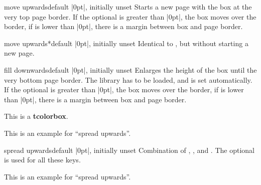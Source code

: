 \begin{docTcbKey}[][doc new=2017-02-13]{move upwards}{}{default |0pt|, initially unset}
Starts a new page with the box at the very top page border.
If the optional  is greater than |0pt|, the box
moves over the border, if  is lower than |0pt|, there is a
margin between box and page border.
\end{docTcbKey}


\begin{docTcbKey}[][doc new=2017-02-13]{move upwards*}{}{default |0pt|, initially unset}
Identical to , but without starting a new page.
\end{docTcbKey}


\begin{docTcbKey}[][doc new=2017-02-13]{fill downwards}{}{default |0pt|, initially unset}
Enlarges the height of the box until the very bottom page border.
The library  has to be loaded, and
 is set automatically.
If the optional  is greater than |0pt|, the box
moves over the border, if  is lower than |0pt|, there is a
margin between box and page border.
\begin{dispListing}
\begin{tcolorbox}[enhanced,fill downwards,
  colframe=blue!75!black,colback=white,show bounding box]
This is a \textbf{tcolorbox}.
\end{tcolorbox}
\end{dispListing}
{\tcbusetemp}
\end{docTcbKey}


\begin{tcolorbox}[enhanced,spread upwards,sharp corners=north,height=3cm,
  colframe=blue!75!black,interior style={top color=blue!50,bottom color=white}]
This is an example for ``spread upwards''.
\end{tcolorbox}
\begin{docTcbKey}[][doc new=2017-02-13]{spread upwards}{}{default |0pt|, initially unset}
Combination of
, , and .
The optional  is used for all these keys.
\begin{dispListing}
\begin{tcolorbox}[enhanced,spread upwards,sharp corners=north,height=3cm,
  colframe=blue!75!black,interior style={top color=blue!50,bottom color=white}]
This is an example for ``spread upwards''.
\end{tcolorbox}
\end{dispListing}
\end{docTcbKey}


